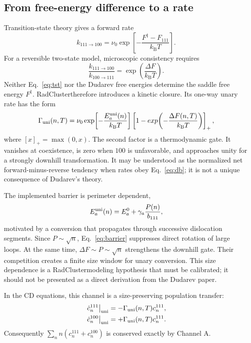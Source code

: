 \documentclass[11pt,a4paper]{article}
\newcommand{\kb}{k_{\mathrm B}}
\newcommand{\rc}{\textsf{RadCluster}}
\begin{document}
\subsection{From free-energy difference to a rate}

Transition-state theory gives a forward rate
\begin{equation}
 k_{111\to100}=\nu_0\exp\!\left[-\frac{F^\ddagger-F_{111}}{\kb T}\right]. \label{eq:tst}
\end{equation}
For a reversible two-state model, microscopic consistency requires
\begin{equation}
 \frac{k_{111\to100}}{k_{100\to111}}
 =\exp\!\left(\frac{\Delta F}{\kb T}\right).                           \label{eq:db}
\end{equation}
Neither Eq.~\eqref{eq:tst} nor the Dudarev free energies determine the saddle free energy $F^\ddagger$.  \rc therefore introduces a kinetic closure.  Its one-way unary rate has the form
\begin{equation}
 \Gamma_{\rm uni}(n,T)=\nu_0
 \exp\!\left[-\frac{E_a^{\rm uni}(n)}{\kb T}\right]
 \left[1-exp\!\left(-\frac{\Delta F(n,T)}{\kb T}\right)\right]_+ ,  \label{eq:unary}
\end{equation}
where $[x]_+=\max(0,x)$.  The second factor is a thermodynamic gate.  It vanishes at coexistence, is zero when $100$ is unfavorable, and approaches unity for a strongly downhill transformation.  It may be understood as the normalized net forward-minus-reverse tendency when rates obey Eq.~\eqref{eq:db}; it is not a unique consequence of Dudarev's theory.

The implemented barrier is perimeter dependent,
\begin{equation}
 E_a^{\rm uni}(n)=E_a^0+\gamma_a\frac{P(n)}{b_{111}},                   \label{eq:barrier}
\end{equation}
motivated by a conversion that propagates through successive dislocation segments.  Since $P\sim\sqrt n$, Eq.~\eqref{eq:barrier} suppresses direct rotation of large loops.  At the same time, $\Delta F\sim P\sim\sqrt n$ strengthens the downhill gate.  Their competition creates a finite size window for unary conversion.  This size dependence is a \rc modeling hypothesis that must be calibrated; it should not be presented as a direct derivation from the Dudarev paper.

In the CD equations, this channel is a size-preserving population transfer:
\begin{align}
 \left.\dot c_n^{111}\right|_{\rm uni}&=-\Gamma_{\rm uni}(n,T)c_n^{111},\\
 \left.\dot c_n^{100}\right|_{\rm uni}&=+\Gamma_{\rm uni}(n,T)c_n^{111}. \label{eq:unimaster}
\end{align}
Consequently $\sum_n n(c_n^{111}+c_n^{100})$ is conserved exactly by Channel A.
\end{document}
